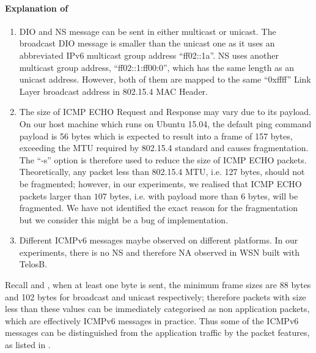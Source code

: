 \paragraph{Explanation of }
\begin{enumerate}
	\item DIO and NS message can be sent in either multicast or unicast. The broadcast DIO message is smaller than the unicast one as it uses an abbreviated IPv6 multicast group address ``ff02::1a''. NS uses another multicast group address, ``ff02::1:ff00:0'', which has the same length as an unicast address. However, both of them are mapped to the same ``0xffff'' Link Layer broadcast address in 802.15.4 MAC Header.
	\item The size of ICMP ECHO Request and Response may vary due to its payload. On our host machine which runs on Ubuntu 15.04, the default ping command payload is 56 bytes which is expected to result into a frame of 157 bytes, exceeding the MTU required by 802.15.4 standard\cite{802154} and causes fragmentation. The ``-s'' option is therefore used to reduce the size of ICMP ECHO packets. Theoretically, any packet less than 802.15.4 MTU, i.e. 127 bytes, should not be fragmented; however, in our experiments, we realised that ICMP ECHO packets larger than $107$ bytes, i.e. with payload more than $6$ bytes, will be fragmented. We have not identified the exact reason for the fragmentation but we consider this might be a bug of implementation.
	\item Different ICMPv6 messages maybe observed on different platforms. In our experiments, there is no NS and therefore NA observed in WSN built with TelosB.
\end{enumerate}

Recall  and , when at least one byte is sent, the minimum frame sizes are 88 bytes and 102 bytes for broadcast and unicast respectively; therefore packets with size less than these values can be immediately categorised as non application packets, which are effectively ICMPv6 messages in practice. Thus some of the ICMPv6 messages can be distinguished from the application traffic by the packet features, as listed in .

